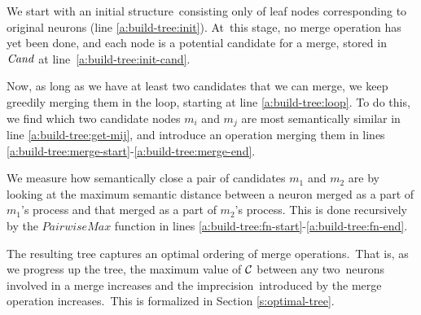 We start with an initial structure consisting only of leaf nodes corresponding to original neurons (line
\ref{a:build-tree:init}). At this stage, no merge operation has yet been done, and each node is a potential
candidate for a merge, stored in $\mathit{Cand}$ at line \ref{a:build-tree:init-cand}.




Now, as long as we have at least two candidates that we can merge, we keep greedily merging them in the loop, starting at line \ref{a:build-tree:loop}. To do this, we find which two candidate nodes $m_i$ and $m_j$ are most semantically similar in line \ref{a:build-tree:get-mij}, and introduce an operation merging them in lines \ref{a:build-tree:merge-start}-\ref{a:build-tree:merge-end}.




We measure how semantically close a pair of candidates $m_1$ and $m_2$ are by looking at the maximum semantic distance between a neuron merged as a part of $m_1$'s process and that merged as a part of $m_2$'s process. This is done recursively by the $\mathit{PairwiseMax}$ function in lines \ref{a:build-tree:fn-start}-\ref{a:build-tree:fn-end}.




The resulting tree captures an optimal ordering of merge operations. That is, as we progress up the tree, the maximum value of $\mathcal{C}$ between any two neurons involved in a merge increases and the imprecision introduced by the merge operation increases. This is formalized in Section \ref{s:optimal-tree}.

